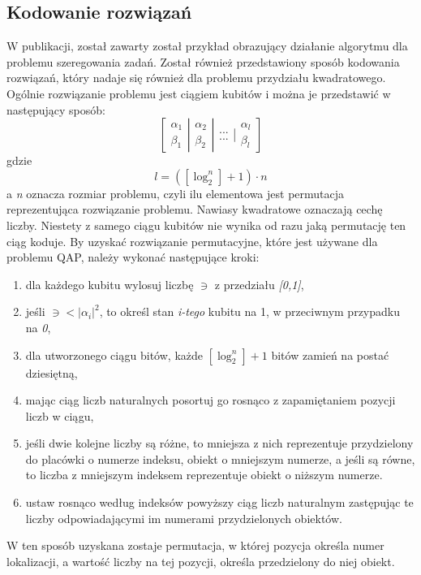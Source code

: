 \subsection{Kodowanie rozwiązań}
W publikacji, został zawarty został przykład obrazujący działanie algorytmu dla problemu szeregowania zadań. Został również przedstawiony sposób kodowania rozwiązań, który nadaje się również dla problemu przydziału kwadratowego. Ogólnie rozwiązanie problemu jest ciągiem kubitów i można je przedstawić w następujący sposób:
\newline
\begin{equation}
\left[ \begin{array}{ccc} \alpha_1 \\ \beta_1 \end{array} \right| \left. \begin{array}{ccc} \alpha_2 \\ \beta_2 \end{array}  \right| \left. \begin{array}{ccc} ... \\ ... \end{array}  \right| \left. \begin{array}{ccc} \alpha_l \\ \beta_l \end{array}  \right]
\end{equation}
\newline
gdzie 
\newline
\begin{equation}
l=([\log_2^n] + 1)\cdot n
\end{equation}
\newline
a \textit{n} oznacza rozmiar problemu, czyli ilu elementowa jest permutacja reprezentująca rozwiązanie problemu. Nawiasy kwadratowe oznaczają cechę liczby.
Niestety z samego ciągu kubitów nie wynika od razu jaką permutację ten ciąg koduje. By uzyskać rozwiązanie permutacyjne, które jest używane dla problemu QAP, należy wykonać następujące kroki:
\begin{enumerate}
\item dla każdego kubitu wylosuj liczbę $\ni$ z przedziału \textit{[0,1]},
\item jeśli $\ni < |\alpha_i|^2$, to określ stan \textit{i-tego} kubitu na 1, w przeciwnym przypadku na \textit{0},
\item dla utworzonego ciągu bitów, każde $[\log_2^n] + 1$ bitów zamień na postać dziesiętną,
\item mając ciąg liczb naturalnych posortuj go rosnąco z zapamiętaniem pozycji liczb w ciągu,
\item jeśli dwie kolejne liczby są różne, to mniejsza z nich reprezentuje przydzielony do placówki o numerze indeksu, obiekt o mniejszym numerze, a jeśli są równe, to liczba z mniejszym indeksem reprezentuje obiekt o niższym numerze.
\item ustaw rosnąco według indeksów powyższy ciąg liczb naturalnym zastępując te liczby odpowiadającymi im numerami przydzielonych obiektów.
\end{enumerate}
W ten sposób uzyskana zostaje permutacja, w której pozycja określa numer lokalizacji, a wartość liczby na tej pozycji, określa przedzielony do niej obiekt.

